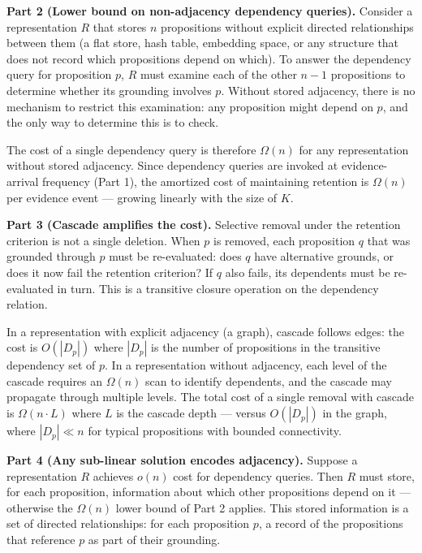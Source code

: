 \documentclass[
]{article}
\begin{document}
\textbf{Part 2 (Lower bound on non-adjacency dependency queries).}
Consider a representation \(R\) that stores \(n\) propositions without
explicit directed relationships between them (a flat store, hash table,
embedding space, or any structure that does not record which propositions
depend on which). To answer the dependency query for proposition \(p\),
\(R\) must examine each of the other \(n - 1\) propositions to determine
whether its grounding involves \(p\). Without stored adjacency, there is
no mechanism to restrict this examination: any proposition might depend
on \(p\), and the only way to determine this is to check.

The cost of a single dependency query is therefore \(\Omega(n)\) for any
representation without stored adjacency. Since dependency queries are
invoked at evidence-arrival frequency (Part 1), the amortized cost of
maintaining retention is \(\Omega(n)\) per evidence event --- growing
linearly with the size of \(K\).

\textbf{Part 3 (Cascade amplifies the cost).} Selective removal under
the retention criterion is not a single deletion. When \(p\) is removed,
each proposition \(q\) that was grounded through \(p\) must be
re-evaluated: does \(q\) have alternative grounds, or does it now fail
the retention criterion? If \(q\) also fails, its dependents must be
re-evaluated in turn. This is a transitive closure operation on the
dependency relation.

In a representation with explicit adjacency (a graph), cascade follows
edges: the cost is \(O(|D_p|)\) where \(|D_p|\) is the number of
propositions in the transitive dependency set of \(p\). In a
representation without adjacency, each level of the cascade requires an
\(\Omega(n)\) scan to identify dependents, and the cascade may propagate
through multiple levels. The total cost of a single removal with cascade
is \(\Omega(n \cdot L)\) where \(L\) is the cascade depth --- versus
\(O(|D_p|)\) in the graph, where \(|D_p| \ll n\) for typical
propositions with bounded connectivity.

\textbf{Part 4 (Any sub-linear solution encodes adjacency).} Suppose a
representation \(R\) achieves \(o(n)\) cost for dependency queries. Then
\(R\) must store, for each proposition, information about which other
propositions depend on it --- otherwise the \(\Omega(n)\) lower bound of
Part 2 applies. This stored information is a set of directed
relationships: for each proposition \(p\), a record of the propositions
that reference \(p\) as part of their grounding.
\end{document}
